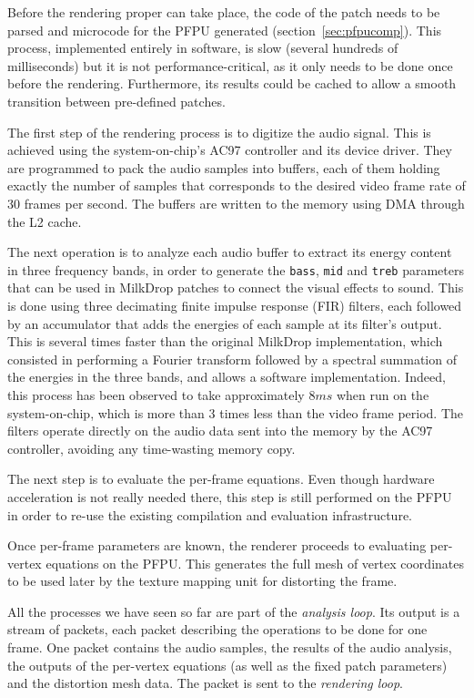 \documentclass[a4paper,11pt]{kthesis}
\begin{document}
Before the rendering proper can take place, the code of the patch needs to be parsed and microcode for the PFPU generated (section~\ref{sec:pfpucomp}). This process, implemented entirely in software, is slow (several hundreds of milliseconds) but it is not performance-critical, as it only needs to be done once before the rendering. Furthermore, its results could be cached to allow a smooth transition between pre-defined patches.

The first step of the rendering process is to digitize the audio signal. This is achieved using the system-on-chip's AC97 controller and its device driver. They are programmed to pack the audio samples into buffers, each of them holding exactly the number of samples that corresponds to the desired video frame rate of 30 frames per second. The buffers are written to the memory using DMA through the L2 cache.

The next operation is to analyze each audio buffer to extract its energy content in three frequency bands, in order to generate the \verb!bass!, \verb!mid! and \verb!treb! parameters that can be used in MilkDrop patches to connect the visual effects to sound. This is done using three decimating finite impulse response (FIR) filters, each followed by an accumulator that adds the energies of each sample at its filter's output. This is several times faster than the original MilkDrop implementation, which consisted in performing a Fourier transform followed by a spectral summation of the energies in the three bands, and allows a software implementation. Indeed, this process has been observed to take approximately $8\unit{ms}$ when run on the system-on-chip, which is more than 3 times less than the video frame period. The filters operate directly on the audio data sent into the memory by the AC97 controller, avoiding any time-wasting memory copy.

The next step is to evaluate the per-frame equations. Even though hardware acceleration is not really needed there, this step is still performed on the PFPU in order to re-use the existing compilation and evaluation infrastructure.

Once per-frame parameters are known, the renderer proceeds to evaluating per-vertex equations on the PFPU. This generates the full mesh of vertex coordinates to be used later by the texture mapping unit for distorting the frame.

All the processes we have seen so far are part of the \textit{analysis loop}. Its output is a stream of packets, each packet describing the operations to be done for one frame. One packet contains the audio samples, the results of the audio analysis, the outputs of the per-vertex equations (as well as the fixed patch parameters) and the distortion mesh data. The packet is sent to the \textit{rendering loop}.
\end{document}
